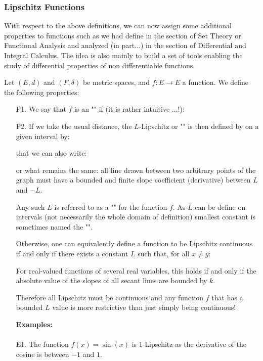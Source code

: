 	
	\subsubsection{Lipschitz Functions}\label{lipschitz functions}
	With respect to the above definitions, we can now assign some additional properties to functions such as we had define in the section of Set Theory or Functional Analysis and analyzed (in part...) in the section of Differential and Integral Calculus. The idea is also mainly to build a set of tools enabling the study of differential properties of non differentiable functions.
	
	Let $(E, d)$ and $(F,\delta)$ be metric spaces, and $f:E \rightarrow E$ a function. We define the following properties:
	\begin{enumerate}
		\item[P1.] We say that $f$ is an "" if (it is rather intuitive ...!):
		
		
		\item[P2.] If we take the usual distance, the $L$-Lipschitz or "" is then defined by on a given interval by:
		
		that we can also write:
		
		or what remains the same: all line drawn between two arbitrary points of the graph must have a bounded and finite slope coefficient (derivative) between $L$ and $-L$.
		
		Any such $L$ is referred to as a "" for the function $f$. As $L$ can be define on intervals (not necessarily the whole domain of definition) smallest constant is sometimes named the "".
		
		Otherwise, one can equivalently define a function to be Lipschitz continuous if and only if there exists a constant $L$ such that, for all $x\neq y$:
		
		For real-valued functions of several real variables, this holds if and only if the absolute value of the slopes of all secant lines are bounded by $k$. 
		
		Therefore all Lipschitz must be continuous and any function $f$ that has a bounded $L$ value is more restrictive than just simply being continuous! 
		
		\begin{tcolorbox}[colframe=black,colback=white,sharp corners]
		\textbf{{\Large {}}Examples:}\\\\
		E1. The function $f(x)=\sin (x)$ is $1$-Lipschitz as the derivative of the cosine is between $-1$ and $1$.\\
		

\end{tcolorbox}
\end{enumerate}
